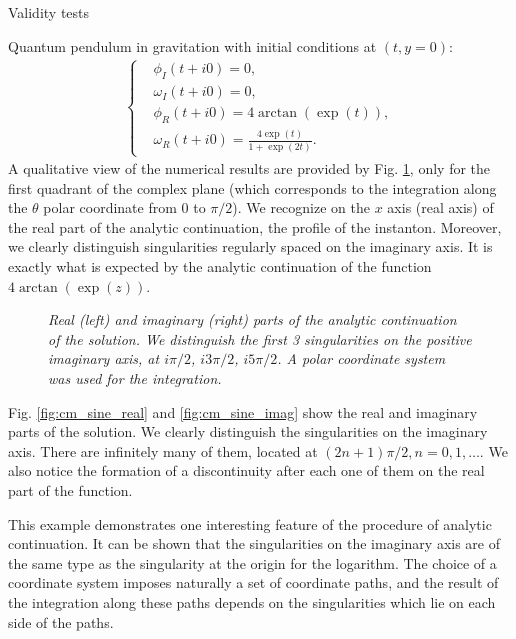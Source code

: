 \begin{section}{Validity tests}
\begin{subsection}{Quantum pendulum in gravitation}
    with initial conditions at $(t,y=0)$:
    \begin{align}
      \left\{
      \begin{aligned}
        &\phi_I(t+i0) = 0,\\
        &\omega_I(t+i0) = 0,\\
        &\phi_R(t+i0) = 4\arctan(\exp(t)),\\
        &\omega_R(t+i0) = \frac{4\exp(t)}{1+\exp(2t)}.
      \end{aligned}
      \right.
    \end{align}
    A qualitative view of the numerical results are provided by
    Fig. \ref{fig:3d_sine}, only for the first quadrant of the complex
    plane (which corresponds to the integration along the $\theta$
    polar coordinate from $0$ to $\pi/2$). We recognize on the $x$
    axis (real axis) of the real part of the analytic continuation,
    the profile of the instanton. Moreover, we clearly distinguish
    singularities regularly spaced on the imaginary axis. It is
    exactly what is expected by the analytic continuation of the
    function $4\arctan(\exp(z))$.

    \begin{figure}[!ht]
      \begin{center}
        
        
        \caption{\em Real (left) and imaginary (right) parts of the
          analytic continuation of the solution. We distinguish the
          first 3 singularities on the positive imaginary axis, at
          $i\pi/2$, $i3\pi/2$, $i5\pi/2$. A polar coordinate system was
          used for the integration.}
        \label{fig:3d_sine} 
      \end{center}
    \end{figure}

    Fig. \ref{fig:cm_sine_real} and \ref{fig:cm_sine_imag} show the real and imaginary parts of the solution. We clearly distinguish the singularities on the
    imaginary axis. There are infinitely many of them, located at
    $(2n+1)\pi/2, n=0,1,\dots$. We also notice the formation of a
    discontinuity after each one of them on the real part of the
    function.

    This example demonstrates one interesting feature of the
    procedure of analytic continuation. It can be shown that the
    singularities on the imaginary axis are of the same type as the
    singularity at the origin for the logarithm. The choice of a
    coordinate system imposes naturally a set of coordinate paths, and
    the result of the integration along these paths depends on the
    singularities which lie on each side of the paths.
    

\end{subsection}
\end{section}
